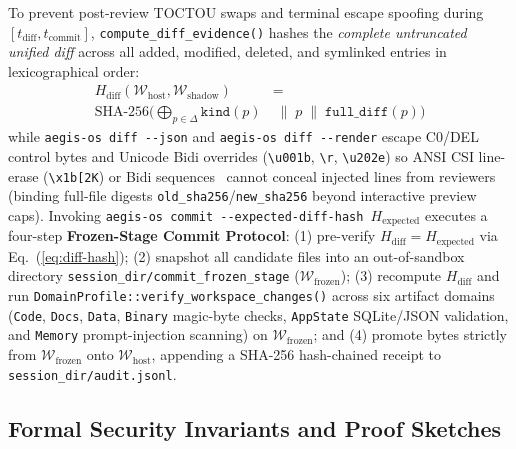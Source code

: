 \documentclass[10pt,journal,compsoc]{IEEEtran}
\begin{document}
To prevent post-review TOCTOU swaps and terminal escape spoofing during $[t_{\text{diff}}, t_{\text{commit}}]$, \texttt{compute\_diff\_evidence()} hashes the \emph{complete untruncated unified diff} across all added, modified, deleted, and symlinked entries in lexicographical order:
\begin{equation}
\label{eq:diff-hash}
\begin{aligned}
H_{\text{diff}}(\mathcal{W}_{\text{host}}, \mathcal{W}_{\text{shadow}}) &= \\
\text{SHA-256}\Big(\bigoplus_{p \in \Delta} \texttt{kind}(p) &\;\|\; p \;\|\; \texttt{full\_diff}(p) \Big)
\end{aligned}
\end{equation}
while \texttt{aegis-os diff -\/-json} and \texttt{aegis-os diff -\/-render} escape C0/DEL control bytes and Unicode Bidi overrides (\texttt{\textbackslash u001b}, \texttt{\textbackslash r}, \texttt{\textbackslash u202e}) so ANSI CSI line-erase (\texttt{\textbackslash x1b[2K}) or Bidi sequences~\cite{boucher2023trojan} cannot conceal injected lines from reviewers (binding full-file digests \texttt{old\_sha256}/\texttt{new\_sha256} beyond interactive preview caps). Invoking \texttt{aegis-os commit -\/-expected-diff-hash $H_{\text{expected}}$} executes a four-step \textbf{Frozen-Stage Commit Protocol}: (1) pre-verify $H_{\text{diff}} = H_{\text{expected}}$ via Eq.~(\ref{eq:diff-hash}); (2) snapshot all candidate files into an out-of-sandbox directory \texttt{session\_dir/\allowbreak commit\_\allowbreak frozen\_\allowbreak stage} ($\mathcal{W}_{\text{frozen}}$); (3) recompute $H_{\text{diff}}$ and run \texttt{DomainProfile::\allowbreak verify\_\allowbreak workspace\_\allowbreak changes()} across six artifact domains (\texttt{Code}, \texttt{Docs}, \texttt{Data}, \texttt{Binary} magic-byte checks, \texttt{AppState} SQLite/JSON validation, and \texttt{Memory} prompt-injection scanning) on $\mathcal{W}_{\text{frozen}}$; and (4) promote bytes strictly from $\mathcal{W}_{\text{frozen}}$ onto $\mathcal{W}_{\text{host}}$, appending a SHA-256 hash-chained receipt to \texttt{session\_dir/audit.jsonl}.

\subsection{Formal Security Invariants and Proof Sketches}
\end{document}
